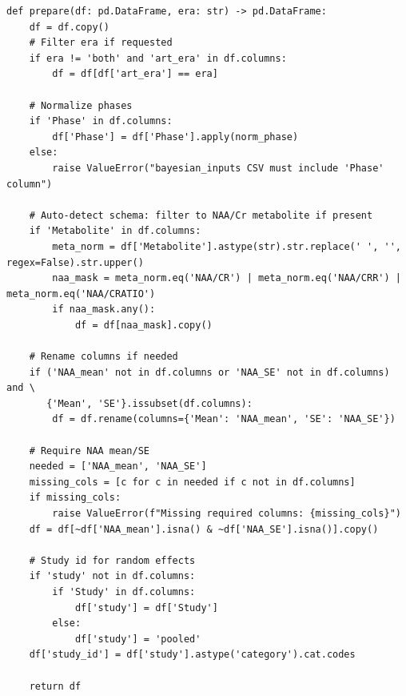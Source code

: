 \documentclass[11pt]{article}
\begin{document}
\begin{lstlisting}[caption={Bayesian v3.6 Runner (Lines 1--100)}]
def prepare(df: pd.DataFrame, era: str) -> pd.DataFrame:
    df = df.copy()
    # Filter era if requested
    if era != 'both' and 'art_era' in df.columns:
        df = df[df['art_era'] == era]

    # Normalize phases
    if 'Phase' in df.columns:
        df['Phase'] = df['Phase'].apply(norm_phase)
    else:
        raise ValueError("bayesian_inputs CSV must include 'Phase' column")

    # Auto-detect schema: filter to NAA/Cr metabolite if present
    if 'Metabolite' in df.columns:
        meta_norm = df['Metabolite'].astype(str).str.replace(' ', '', regex=False).str.upper()
        naa_mask = meta_norm.eq('NAA/CR') | meta_norm.eq('NAA/CRR') | meta_norm.eq('NAA/CRATIO')
        if naa_mask.any():
            df = df[naa_mask].copy()

    # Rename columns if needed
    if ('NAA_mean' not in df.columns or 'NAA_SE' not in df.columns) and \
       {'Mean', 'SE'}.issubset(df.columns):
        df = df.rename(columns={'Mean': 'NAA_mean', 'SE': 'NAA_SE'})

    # Require NAA mean/SE
    needed = ['NAA_mean', 'NAA_SE']
    missing_cols = [c for c in needed if c not in df.columns]
    if missing_cols:
        raise ValueError(f"Missing required columns: {missing_cols}")
    df = df[~df['NAA_mean'].isna() & ~df['NAA_SE'].isna()].copy()

    # Study id for random effects
    if 'study' not in df.columns:
        if 'Study' in df.columns:
            df['study'] = df['Study']
        else:
            df['study'] = 'pooled'
    df['study_id'] = df['study'].astype('category').cat.codes

    return df
\end{lstlisting}
\end{document}
